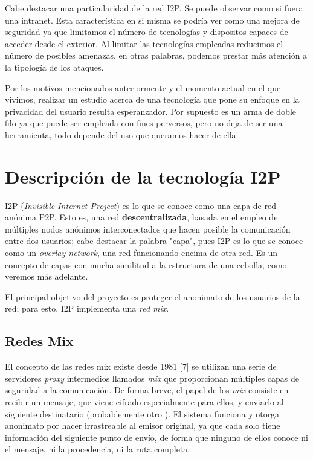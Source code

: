 \documentclass{article}
\begin{document}
Cabe destacar una particularidad de la red I2P. Se puede observar como si fuera una intranet. Esta característica en si misma se podría ver 
como una mejora de seguridad ya que limitamos el número de tecnologías y dispositos capaces de acceder desde el exterior. Al limitar las tecnologías 
empleadas reducimos el número de posibles amenazas, en otras palabras, podemos prestar más atención a la tipología de los ataques. 

Por los motivos mencionados anteriormente y el momento actual en el que vivimos, realizar un estudio acerca de una tecnología que 
pone su enfoque en la privacidad del usuario resulta esperanzador. Por supuesto es un arma de doble filo ya que puede ser empleada con fines 
perversos, pero no deja de ser una herramienta, todo depende del uso que queramos hacer de ella.

\pagebreak

\section{Descripción de la tecnología I2P}

I2P (\textit{Invisible Internet Project}) es lo que se conoce como una capa de red anónima P2P. Esto es, una red \textbf{descentralizada}, basada en el empleo de múltiples nodos anónimos interconectados
que hacen posible la comunicación entre dos usuarios; cabe destacar la palabra "capa", pues I2P es lo que se conoce como un \textit{overlay network}, una red funcionando encima de otra red. Es un concepto
de capas con mucha similitud a la estructura de una cebolla, como veremos más adelante.

El principal objetivo del proyecto es proteger el anonimato de los usuarios de la red; para esto, I2P implementa una \textit{red mix}.

\subsection{Redes Mix}
El concepto de las redes mix existe desde 1981 [7] se utilizan una serie de servidores \textit{proxy} intermedios llamados \textit{mix} que proporcionan múltiples
capas de seguridad a la comunicación. De forma breve, el papel de los \textit{mix} consiste en recibir un mensaje, que viene cifrado especialmente para ellos,
y enviarlo al siguiente destinatario (probablemente otro ).
El sistema funciona y otorga anonimato por hacer irrastreable al emisor original, ya que cada  solo tiene información del siguiente punto de envío, de forma que ninguno de ellos conoce
ni el mensaje, ni la procedencia, ni la ruta completa.
\end{document}
